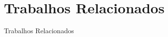 \section{Trabalhos Relacionados}\label{sec:trabalhos}
\begin{frame}[allowframebreaks]{Trabalhos Relacionados}
	\begin{tabu}
	\end{tabu}
\end{frame}